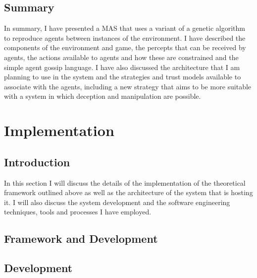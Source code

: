 \documentclass[]{final_report}
\begin{document}
\subsection{Summary}
In summary, I have presented a MAS that uses a variant of a genetic algorithm to reproduce agents between instances of the environment. I have described the components of the environment and game, the percepts that can be received by agents, the actions available to agents and how these are constrained and the simple agent gossip language. I have also discussed the architecture that I am planning to use in the system and the strategies and trust models available to associate with the agents, including a new strategy that aims to be more suitable with a system in which deception and manipulation are possible.

\section{Implementation}
\subsection{Introduction}
In this section I will discuss the details of the implementation of the theoretical framework outlined above as well as the architecture of the system that is hosting it. I will also discuss the system development and the software engineering techniques, tools and processes I have employed.

\subsection{Framework and Development}


\subsection{Development}
\end{document}
